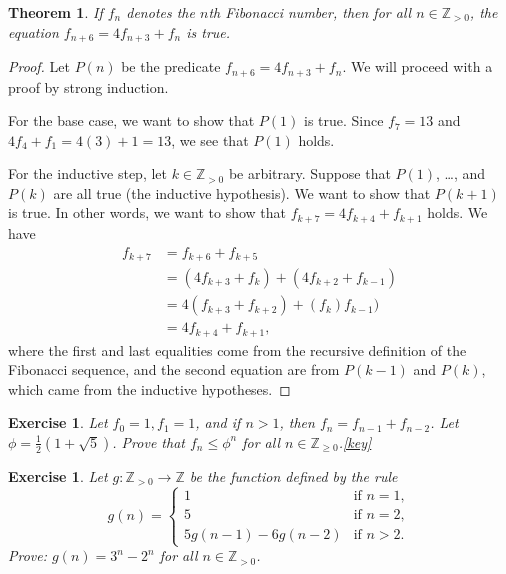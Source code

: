 \documentclass{book}
\newcounter{ekcounter}%
\theoremstyle{ekimcustom}
\newtheorem{theorem}[ekcounter]{Theorem}
\newtheorem{exercise}[ekcounter]{Exercise}
\begin{document}
\begin{theorem}
If $f_n$ denotes the $n$th Fibonacci number, then for all $n \in \mathbb{Z}_{>0}$, the equation $f_{n+6}=4f_{n+3}+f_n$ is true.
\end{theorem}
\begin{proof}
Let $P(n)$ be the predicate $f_{n+6}=4f_{n+3}+f_n$. We will proceed with a proof by strong induction.

For the base case, we want to show that $P(1)$ is true. Since $f_7=13$ and $4f_4+f_1=4(3)+1=13$, we see that $P(1)$ holds.

For the inductive step, let $k \in \mathbb{Z}_{>0}$ be arbitrary. Suppose that $P(1)$, \dots, and $P(k)$ are all true (the inductive hypothesis). We want to show that $P(k+1)$ is true. In other words, we want to show that $f_{k+7}=4f_{k+4}+f_{k+1}$ holds. We have
\begin{align*}
f_{k+7} 
&= f_{k+6} + f_{k+5} \\
&= (4f_{k+3}+f_k) + (4f_{k+2}+f_{k-1}) \\
&= 4(f_{k+3}+f_{k+2})+(f_k) f_{k-1}) \\
&= 4f_{k+4} + f_{k+1},
\end{align*}
where the first and last equalities come from the recursive definition of the Fibonacci sequence, and the second equation are from $P(k-1)$ and $P(k)$, which came from the inductive hypotheses.
\end{proof}

\begin{exercise}
Let $f_0=1, f_1=1$, and if $n>1$, then $f_n=f_{n-1}+f_{n-2}$. Let $\phi = \frac12(1+\sqrt{5})$. Prove that $f_n \leq \phi^n$ for all $n \in \mathbb{Z}_{\geq 0}$.\quad\quad\href{https://www.sharelatex.com/read/vxjjxmvmgjmj}{{\color{red}[key]}}
\end{exercise}

\begin{exercise}
Let $g : \mathbb{Z}_{>0} \to \mathbb{Z}$ be the function defined by the rule
\[
g(n) = \left\{
\begin{array}{ll}
1 & \text{if } n=1,\\
5 & \text{if } n=2,\\
5g(n-1)-6g(n-2) & \text{if } n > 2.
\end{array}
\right.
\]
Prove: $g(n)=3^n-2^n$ for all $n \in \mathbb{Z}_{>0}$.
\end{exercise}
\end{document}
